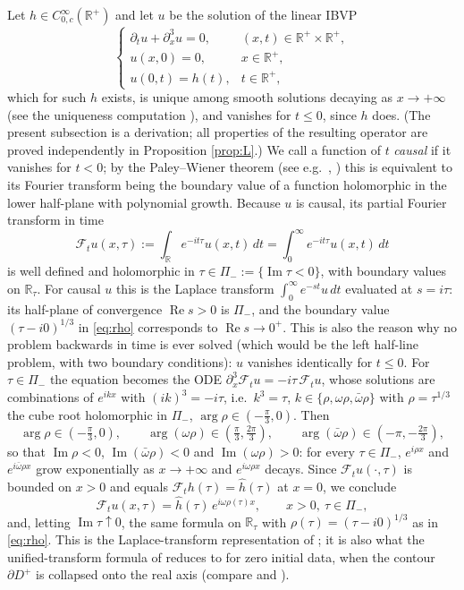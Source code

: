 \documentclass[10pt,reqno]{amsart}
\theoremstyle{remark}
\numberwithin{equation}{section}
\newcommand{\R}{\mathbb R}
\newcommand{\om}{\omega}
\newcommand{\pd}{\partial}
\newcommand{\re}{\operatorname{Re}}
\newcommand{\ima}{\operatorname{Im}}
\newcommand{\F}{\mathcal{F}}
\begin{document}
 Let $h\in C^\infty_{0,c}(\R^+)$ and let $u$ be the solution of the linear IBVP
\begin{equation}\label{eq:linIBVP}
\begin{cases}
\pd_tu+\pd_x^3u=0, & (x,t)\in\R^+\times\R^+,\\
u(x,0)=0, & x\in\R^+,\\
u(0,t)=h(t), & t\in\R^+,
\end{cases}
\end{equation}
which for such $h$ exists, is unique among smooth solutions decaying as $x\to+\infty$ (see the uniqueness computation \cite[(1.3)]{Holmer}), and vanishes for $t\le0$, since $h$ does. (The present subsection is a derivation; all properties of the resulting operator are proved independently in Proposition \ref{prop:L}.) We call a function of $t$ \emph{causal} if it vanishes for $t<0$; by the Paley--Wiener theorem (see e.g.\ \cite[Ch.~19]{Rudin}, \cite[Thm.~7.4.3]{Hormander}) this is equivalent to its Fourier transform being the boundary value of a function holomorphic in the lower half-plane with polynomial growth. Because $u$ is causal, its partial Fourier transform in time
$$\F_tu(x,\tau):=\int_\R e^{-it\tau}u(x,t)\,dt=\int_0^\infty e^{-it\tau}u(x,t)\,dt$$
is well defined and holomorphic in $\tau\in\Pi_-:=\{\ima\tau<0\}$, with boundary values on $\R_\tau$. For causal $u$ this is the Laplace transform $\int_0^\infty e^{-st}u\,dt$ evaluated at $s=i\tau$: its half-plane of convergence $\re s>0$ is $\Pi_-$, and the boundary value $(\tau-i0)^{1/3}$ in \eqref{eq:rho} corresponds to $\re s\to0^+$. This is also the reason why no problem backwards in time is ever solved (which would be the left half-line problem, with two boundary conditions): $u$ vanishes identically for $t\le0$. For $\tau\in\Pi_-$ the equation becomes the ODE $\pd_x^3\F_tu=-i\tau\,\F_tu$, whose solutions are combinations of $e^{ikx}$ with $(ik)^3=-i\tau$, i.e.\ $k^3=\tau$, $k\in\{\rho,\om\rho,\bar\om\rho\}$ with $\rho=\tau^{1/3}$ the cube root holomorphic in $\Pi_-$, $\arg\rho\in(-\frac\pi3,0)$. Then
$$\arg\rho\in(-\tfrac\pi3,0),\qquad \arg(\om\rho)\in(\tfrac\pi3,\tfrac{2\pi}3),\qquad \arg(\bar\om\rho)\in(-\pi,-\tfrac{2\pi}3),$$
so that $\ima\rho<0$, $\ima(\bar\om\rho)<0$ and $\ima(\om\rho)>0$: for every $\tau\in\Pi_-$, $e^{i\rho x}$ and $e^{i\bar\om\rho x}$ grow exponentially as $x\to+\infty$ and $e^{i\om\rho x}$ decays. Since $\F_tu(\cdot,\tau)$ is bounded on $x>0$ and equals $\F_th(\tau)=\widehat h(\tau)$ at $x=0$, we conclude
\begin{equation}\label{eq:BSZ}
\F_tu(x,\tau)=\widehat h(\tau)\,e^{i\om\rho(\tau)x},\qquad x>0,\ \tau\in\Pi_- ,
\end{equation}
and, letting $\ima\tau\uparrow0$, the same formula on $\R_\tau$ with $\rho(\tau)=(\tau-i0)^{1/3}$ as in \eqref{eq:rho}. This is the Laplace-transform representation of \cite{BSZ1}; it is also what the unified-transform formula of \cite{Fokas1,Fokas2} reduces to for zero initial data, when the contour $\partial D^+$ is collapsed onto the real axis (compare \cite[(2.36)]{Fokas2} and \cite[Remark 2.1]{HY}).
\end{document}
